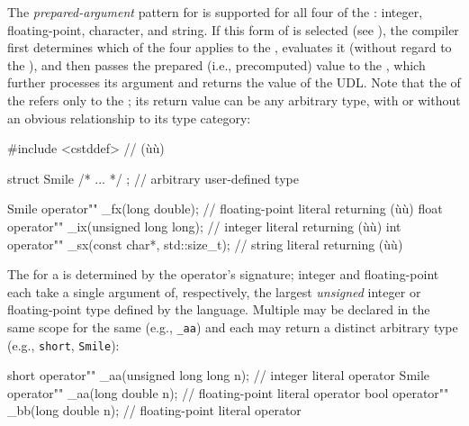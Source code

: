 The \emph{prepared-argument} pattern for  is
supported for all four of the : integer,
floating-point, character, and string. If this form of  is selected (see ), the compiler
first determines which of the four  applies
to the , evaluates it (without regard to the
), and then passes the prepared (i.e., precomputed)
value to the , which further processes its argument
and returns the value of the UDL. Note that the  of the  refers only to the ; its return value can be any arbitrary type, with or without an
obvious relationship to its type category:

\begin{emcppshiddenlisting}[emcppsbatch=e10]
#include <cstddef>  // (ù{}ù)
\end{emcppshiddenlisting}
\begin{emcppslisting}[emcppsbatch=e10]
struct Smile { /* ... */ };  // arbitrary user-defined type

Smile operator"" _fx(long double);  // floating-point literal returning (ù{}ù)
float operator"" _ix(unsigned long long);  // integer literal returning (ù{}ù)
int operator"" _sx(const char*, std::size_t);  // string literal returning (ù{}ù)
\end{emcppslisting}
    
\noindent The  for a  is determined by the operator's signature; integer and
floating-point  each take a single argument of,
respectively, the largest \emph{unsigned} integer or floating-point type
defined by the language. Multiple  may be declared in the same scope for the same  (e.g., \lstinline!_aa!) and each may return a distinct arbitrary
type (e.g., \lstinline!short!, \lstinline!Smile!):

\begin{emcppslisting}[emcppsbatch=e10]
short operator"" _aa(unsigned long long n);  // integer literal operator
Smile operator"" _aa(long double n);         // floating-point literal operator
bool  operator"" _bb(long double n);         // floating-point literal operator
\end{emcppslisting}
    
